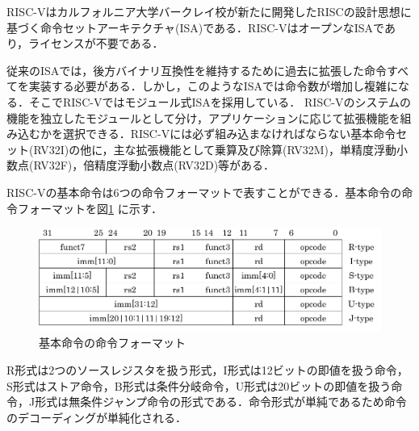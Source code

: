 
RISC-Vはカルフォルニア大学バークレイ校が新たに開発したRISCの設計思想に基づく命令セットアーキテクチャ(ISA)である．RISC-VはオープンなISAであり，ライセンスが不要である．

従来のISAでは，後方バイナリ互換性を維持するために過去に拡張した命令すべてを実装する必要がある．しかし，このようなISAでは命令数が増加し複雑になる．そこでRISC-Vではモジュール式ISAを採用している．\cite{bib:risc-v-module}
RISC-Vのシステムの機能を独立したモジュールとして分け，アプリケーションに応じて拡張機能を組み込むかを選択できる．RISC-Vには必ず組み込まなければならない基本命令セット(RV32I)の他に，主な拡張機能として乗算及び除算(RV32M)，単精度浮動小数点(RV32F)，倍精度浮動小数点(RV32D)等がある．

RISC-Vの基本命令は6つの命令フォーマットで表すことができる．基本命令の命令フォーマットを図\ref{fig:RISC-V_Instruction_formats}
に示す．

\begin{figure}
    \centering
    \includegraphics[scale=0.8]{image/Inst_Format.pdf}
    \caption{基本命令の命令フォーマット}
    \label{fig:RISC-V_Instruction_formats}
\end{figure}

R形式は2つのソースレジスタを扱う形式，I形式は12ビットの即値を扱う命令，S形式はストア命令，B形式は条件分岐命令，U形式は20ビットの即値を扱う命令，J形式は無条件ジャンプ命令の形式である．命令形式が単純であるため命令のデコーディングが単純化される．